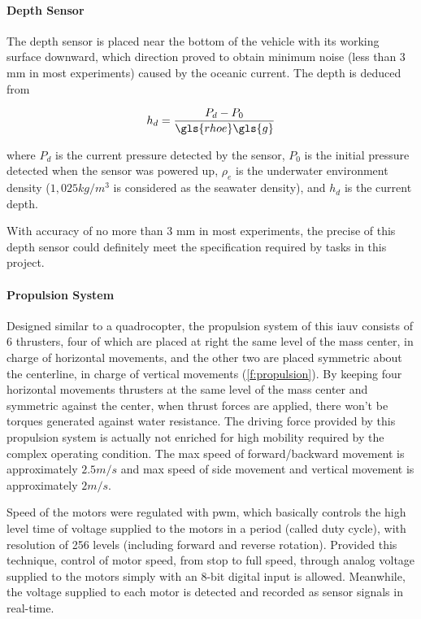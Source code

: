 \paragraph{Depth Sensor}

The depth sensor is placed near the bottom of the vehicle with its working
surface downward, which direction proved to obtain minimum noise (less than 3 mm
in most experiments) caused by the oceanic current. The depth is deduced from

\begin{equation}
    h_d = \frac{P_d - P_0}{\gls{rhoe} \gls{g}}
\end{equation}

where \ensuremath{P_d} is the current pressure detected by the sensor,
\ensuremath{P_0} is the initial pressure detected when the sensor was powered
up, \ensuremath{\rho_e} is the underwater environment density (\ensuremath{1,025
    kg/m^3} is considered as the seawater density), and \ensuremath{h_d} is the
current depth.

With accuracy of no more than 3 mm in most experiments, the precise of this
depth sensor could definitely meet the specification required by tasks in this
project.

\paragraph{Propulsion System}

Designed similar to a quadrocopter, the propulsion system of this \gls{iauv}
consists of 6 thrusters, four of which are placed at right the same level of the
mass center, in charge of horizontal movements, and the other two are placed
symmetric about the centerline, in charge of vertical movements
(\autoref{f:propulsion}). By keeping four horizontal movements thrusters at the
same level of the mass center and symmetric against the center, when thrust
forces are applied, there won't be torques generated against water resistance.
The driving force provided by this propulsion system is actually not enriched
for high mobility required by the complex operating condition. The max speed of
forward/backward movement is approximately \ensuremath{2.5 m/s} and max speed of
side movement and vertical movement is approximately \ensuremath{2 m/s}.

Speed of the motors were regulated with \gls{pwm}, which basically controls the
high level time of voltage supplied to the motors in a period (called duty
cycle), with resolution of 256 levels (including forward and reverse rotation).
Provided this technique, control of motor speed, from stop to full speed,
through analog voltage supplied to the motors simply with an 8-bit digital input
is allowed. Meanwhile, the voltage supplied to each motor is detected and
recorded as sensor signals in real-time.

